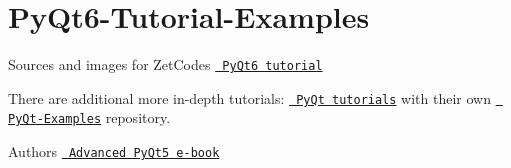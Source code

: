 \chapter{Py\+Qt6-\/\+Tutorial-\/\+Examples}
\hypertarget{md__2home_2admin_2github_2comp-graphics-resources_2PyQt_2ZetCode_2PyQt6-Tutorial-Examples-main_2README}{}\label{md__2home_2admin_2github_2comp-graphics-resources_2PyQt_2ZetCode_2PyQt6-Tutorial-Examples-main_2README}
\label{md__2home_2admin_2github_2comp-graphics-resources_2PyQt_2ZetCode_2PyQt6-Tutorial-Examples-main_2README_autotoc_md8}%
%
Sources and images for Zet\+Code\textquotesingle{}s \href{http://zetcode.com/pyqt6/}{\texttt{ Py\+Qt6 tutorial}}

There are additional more in-\/depth tutorials\+: \href{http://zetcode.com/all/\#pyqt}{\texttt{ Py\+Qt tutorials}} with their own \href{https://github.com/janbodnar/PyQt-Examples}{\texttt{ Py\+Qt-\/\+Examples}} repository.

Author\textquotesingle{}s \href{http://zetcode.com/ebooks/advancedpyqt5/}{\texttt{ Advanced Py\+Qt5 e-\/book}} 